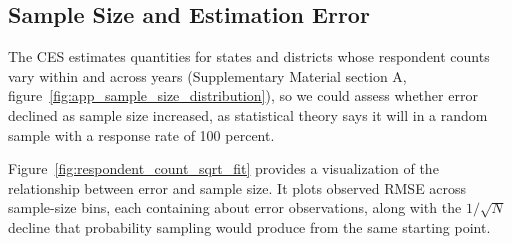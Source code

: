 \documentclass[12pt]{article}
\begin{document}



\subsection{Sample Size and Estimation Error}
The CES estimates quantities for states and districts whose respondent counts vary within and across years (Supplementary Material section A, figure~\ref{fig:app_sample_size_distribution}), so we could assess whether error declined as sample size increased, as statistical theory says it will in a random sample with a response rate of 100 percent.

Figure~\ref{fig:respondent_count_sqrt_fit} provides a visualization of the relationship between error and sample size. It plots observed RMSE across sample-size bins, each containing about \FitBinObs{} error observations, along with the $1/\sqrt{N}$ decline that probability sampling would produce from the same starting point.
\end{document}

